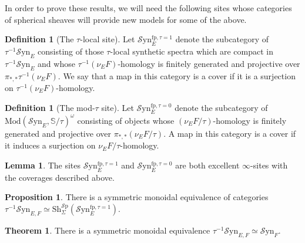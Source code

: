 \documentclass[10pt]{amsart}
\theoremstyle{definition}
\numberwithin{figure}{section}
\numberwithin{equation}{section}
\newtheorem{theorem}[figure]{Theorem}
\newtheorem{lemma}[figure]{Lemma}
\newtheorem{proposition}[figure]{Proposition}
\newtheorem{definition}[figure]{Definition}
\theoremstyle{cited}
\newcommand{\bS}{\mathbb{S}}
\newcommand{\Sp}{{\mathcal{S}\mathrm{p}}}
\newcommand{\Mod}{\mathrm{Mod}}
\newcommand{\Sh}{\mathrm{Sh}}
\newcommand{\fp}{\mathrm{fp}}
\newcommand{\Syn}{\mathcal{S}\mathrm{yn}}
\begin{document}
In order to prove these results, we will need the following sites whose categories of spherical sheaves will provide new models for some of the above.

\begin{definition}[The $\tau$-local site]
  Let $\Syn_E^{\fp, \tau=1}$ denote the subcategory of $\tau^{-1}\Syn_E$ consisting of those $\tau$-local synthetic spectra which are compact in $\tau^{-1}\Syn_E$ and whose $\tau^{-1}(\nu_E F)$-homology is finitely generated and projective over $\pi_{*,*}\tau^{-1}(\nu_E F)$. We say that a map in this category is a cover if it is a surjection on $\tau^{-1}(\nu_E F)$-homology.
\end{definition}

\begin{definition}[The mod-$\tau$ site]
  Let $\Syn_E^{\fp, \tau=0}$ denote the subcategory of $\Mod(\Syn_E, \bS/\tau)^\omega$ consisting of objects whose $(\nu_E F/\tau)$-homology is finitely generated and projective over $\pi_{*,*}(\nu_E F/ \tau)$. A map in this category is a cover if it induces a surjection on $\nu_E F/ \tau$-homology.
\end{definition}

\begin{lemma}
  The sites $\Syn_E^{\fp, \tau=1}$ and $\Syn_E^{\fp, \tau=0}$ are both excellent $\infty$-sites with the coverages described above.
\end{lemma}

\begin{proposition}
  There is a symmetric monoidal equivalence  of categories $\tau^{-1}\Syn_{E,F}\simeq \Sh_{\Sigma}^\Sp(\Syn_E^{\fp, \tau=1})$.
\end{proposition}

\begin{theorem}
  There is a symmetric monoidal equivalence $\tau^{-1}\Syn_{E,F}\simeq \Syn_F$.
\end{theorem}
\end{document}
